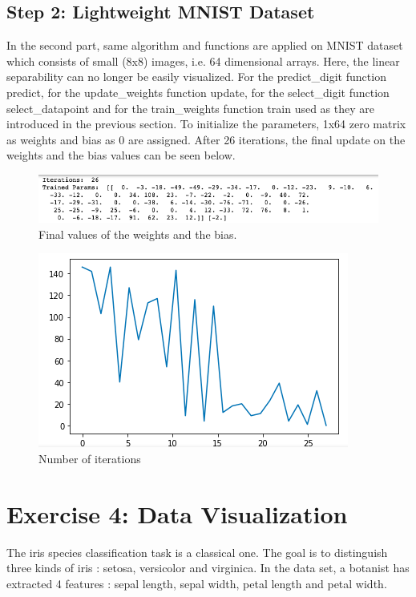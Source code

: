 \documentclass[onecolumn]{article}
\begin{document}
\subsection{Step 2: Lightweight MNIST Dataset}

In the second part, same algorithm and functions are applied on MNIST dataset which consists of small (8x8) images, i.e. 64 dimensional arrays. Here, the linear separability can no longer be easily visualized.\newline
For the predict\_digit function predict, for the update\_weights function update, for the select\_digit function select\_datapoint and for the train\_weights function train used as they are introduced in the previous section.\newline
To initialize the parameters, 1x64 zero matrix as weights and bias as 0 are assigned.\newline
After 26 iterations, the final update on the weights and the bias values can be seen below.

\begin{figure}[h]
	\centering
	\includegraphics[width=.8\linewidth]{fig/updates_mnist.png}
	\caption{\label{fig:updates_mnist}
		Final values of the weights and the bias.}
\end{figure}

\begin{figure}[h]
	\centering
	\includegraphics[width=.4\linewidth]{fig/iterations_mnist.png}
	\caption{\label{fig:iterations_mnist}
		Number of iterations}
\end{figure}


\section{Exercise 4: Data Visualization}
The iris species classification task is a classical one. The goal is to distinguish three kinds of iris : setosa, versicolor and virginica. In the data set, a botanist has extracted 4 features : sepal length, sepal width, petal length and petal width.
\end{document}
